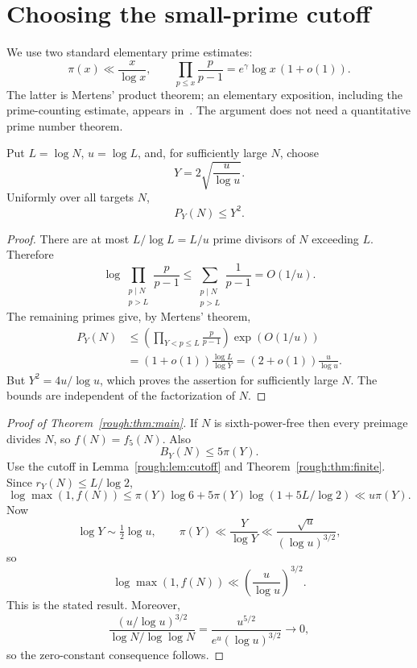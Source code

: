 \section{Choosing the small-prime cutoff}
We use two standard elementary prime estimates:
\begin{equation}\label{rough:eq:mertens}
 \pi(x)\ll\frac{x}{\log x},\qquad
 \prod_{p\le x}\frac{p}{p-1}=e^\gamma\log x\,(1+o(1)).
\end{equation}
The latter is Mertens' product theorem; an elementary exposition, including the prime-counting estimate, appears in~\cite{mertens}. The argument does not need a quantitative prime number theorem.

\begin{lemma}\label{rough:lem:cutoff}
Put $L=\log N$, $u=\log L$, and, for sufficiently large $N$, choose
\[
 Y=2\sqrt{\frac{u}{\log u}}.
\]
Uniformly over all targets $N$,
\[
 P_Y(N)\le Y^2.
\]
\end{lemma}
\begin{proof}
There are at most $L/\log L=L/u$ prime divisors of $N$ exceeding $L$. Therefore
\[
 \log\prod_{\substack{p\mid N\\p>L}}\frac{p}{p-1}
 \le\sum_{\substack{p\mid N\\p>L}}\frac{1}{p-1}
 =O(1/u).
\]
The remaining primes give, by Mertens' theorem,
\[
 \begin{split}
 P_Y(N)
 &\le \left(\prod_{Y<p\le L}\frac{p}{p-1}\right)\exp(O(1/u))\\
 &=(1+o(1))\frac{\log L}{\log Y}
 =(2+o(1))\frac{u}{\log u}.
 \end{split}
\]
But $Y^2=4u/\log u$, which proves the assertion for sufficiently large $N$. The bounds are independent of the factorization of $N$.
\end{proof}

\begin{proof}[Proof of Theorem~\ref{rough:thm:main}]
If $N$ is sixth-power-free then every preimage divides $N$, so $f(N)=f_5(N)$. Also
\[
 B_Y(N)\le5\pi(Y).
\]
Use the cutoff in Lemma~\ref{rough:lem:cutoff} and Theorem~\ref{rough:thm:finite}. Since $r_Y(N)\le L/\log2$,
\[
 \log\max(1,f(N))
 \le\pi(Y)\log6+5\pi(Y)\log(1+5L/\log2)
 \ll u\pi(Y).
\]
Now
\[
 \log Y\sim\tfrac12\log u,
 \qquad
 \pi(Y)\ll\frac{Y}{\log Y}
 \ll\frac{\sqrt u}{(\log u)^{3/2}},
\]
so
\[
 \log\max(1,f(N))\ll\left(\frac{u}{\log u}\right)^{3/2}.
\]
This is the stated result. Moreover,
\[
 \frac{(u/\log u)^{3/2}}{\log N/\log\log N}
 =\frac{u^{5/2}}{e^u(\log u)^{3/2}}\longrightarrow0,
\]
so the zero-constant consequence follows.
\end{proof}

